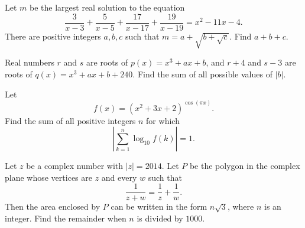 \documentclass[11pt]{article}
\theoremstyle{definition}
\begin{document}
\begin{question}[name={2014 AIME I, \href{https://artofproblemsolving.com/community/c4p3428788}{Problem 14}}]
	Let $m$ be the largest real solution to the equation\[\frac{3}{x-3}+\frac{5}{x-5}+\frac{17}{x-17}+\frac{19}{x-19}= x^2-11x-4.\]There are positive integers $a,b,c$ such that $m = a + \sqrt{b+\sqrt{c}}$. Find $a+b+c$.
\end{question}


%	












\begin{question}[name={2014 AIME II, \href{https://artofproblemsolving.com/community/c4p3444093}{Problem 5}}]
	Real numbers $r$ and $s$ are roots of $p(x)=x^3+ax+b$, and $r+4$ and $s-3$ are roots of $q(x)=x^3+ax+b+240$. Find the sum of all possible values of $|b|$.
\end{question}


%	











\begin{question}[name={2014 AIME II, \href{https://artofproblemsolving.com/community/c4p3444108}{Problem 7}}]
	Let $$f(x) = (x^2+3x+2)^{\cos(\pi x)}.$$ Find the sum of all positive integers $n$ for which\[\left| \sum_{k=1}^n \log_{10} f(k) \right| = 1.\]
\end{question}


%	













\begin{question}[name={2014 AIME II, \href{https://artofproblemsolving.com/community/c4p3444114}{Problem 10}}]
	Let $z$ be a complex number with $|z| = 2014$. Let $P$ be the polygon in the complex plane whose vertices are $z$ and every $w$ such that $$\frac{1}{z+w} = \frac{1}{z} + \frac{1}{w}.$$ Then the area enclosed by $P$ can be written in the form $n\sqrt{3}$, where $n$ is an integer. Find the remainder when $n$ is divided by $1000$.	
\end{question}
\end{document}
